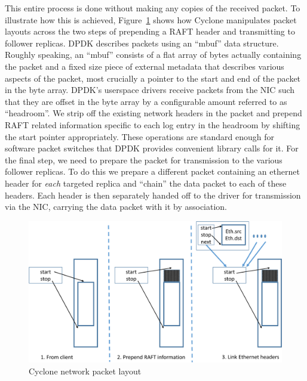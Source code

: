 \documentclass[pageno]{jpaper}
\begin{document}
This entire process is done without making any copies of the received packet.
To illustrate how this is achieved, Figure~\ref{fig:packet_layout} shows how
Cyclone manipulates packet layouts across the two steps of prepending a RAFT
header and transmitting to follower replicas. DPDK describes packets using an
``mbuf'' data structure. Roughly speaking, an ``mbuf'' consists of a flat array
of bytes actually containing the packet and a fixed size piece of external
metadata that describes various aspects of the packet, most crucially a pointer
to the start and end of the packet in the byte array. DPDK's userspace drivers
receive packets from the NIC such that they are offset in the byte array by a
configurable amount referred to as ``headroom''. We strip off the existing
network headers in the packet and prepend RAFT related information specific to
each log entry in the headroom by shifting the start pointer appropriately.
These operations are standard enough for software packet switches that DPDK
provides convenient library calls for it. For the final step, we need to prepare
the packet for transmission to the various follower replicas. To do this we
prepare a different packet containing an ethernet header for \emph{each}
targeted replica and ``chain'' the data packet to each of these headers. Each
header is then separately handed off to the driver for transmission via the NIC,
carrying the data packet with it by association.

\begin{figure}
  \centering
  \includegraphics[scale=0.35]{figures2/network_packet.pdf}
  \caption{Cyclone network packet layout}
  \label{fig:packet_layout}
\end{figure}
\end{document}
